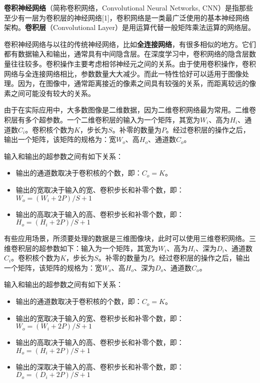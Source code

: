 

\textbf{卷积神经网络}（简称卷积网络，Convolutional Neural Networks, CNN）是指那些至少有一层为卷积层的神经网络[1]，卷积网络是一类最广泛使用的基本神经网络架构。\textbf{卷积层}（Convolutional Layer）是用运算代替一般矩阵乘法运算的网络层。

卷积神经网络与以往的传统神经网络，比如\textbf{全连接网络}，有很多相似的地方。它们都有数据输入和输出，通常具有中间隐含层。在深度学习中，卷积网络的隐含层数量往往较多。卷积操作主要考虑相邻神经元之间的关系。由于使用卷积操作，卷积网络与全连接网络相比，参数数量大大减少。而此一特性恰好可以适用于图像处理。因为，在图像中，通常距离接近的像素之间具有较强的关系，而距离较远的像素之间可能没有较大的关系。

由于在实际应用中，大多数图像是二维数据，因为二维卷积网络最为常用。二维卷积层有多个超参数。一个二维卷积层的输入为一个矩阵，其宽为$W_i$、高为$H_i$、通道数$C_i$。卷积核个数为$K$，步长为$S$。补零的数量为$P$。经过卷积层的操作之后，输出一个矩阵，该矩阵的规格为：宽$W_o$、高$H_o$、通道数$C_o$。

输入和输出的超参数之间有如下关系： \\
\begin{itemize}
\item 输出的通道数取决于卷积核的个数，即：$C_o=K$。
\item 输出的宽取决于输入的宽、卷积步长和补零个数，即：$W_o=(W_i+2P)/S+1$
\item 输出的高取决于输入的高、卷积步长和补零个数，即：$H_o=(H_i+2P)/S+1$
\end{itemize}

有些应用场景，所须要处理的数据是三维图像块，此时可以使用三维卷积网络。三维卷积层的超参数如下：输入为一个矩阵，其宽为$W_i$、高为$H_i$、深为$D_i$、通道数$C_i$。卷积核个数为$K$，步长为$S$。补零的数量为$P$。经过卷积层的操作之后，输出一个矩阵，该矩阵的规格为：宽$W_o$、高$H_o$、深为$D_o$、通道数$C_o$。

输入和输出的超参数之间有如下关系： \\
\begin{itemize}
\item 输出的通道数取决于卷积核的个数，即：$C_o=K$。
\item 输出的宽取决于输入的宽、卷积步长和补零个数，即：$W_o=(W_i+2P)/S+1$
\item 输出的高取决于输入的高、卷积步长和补零个数，即：$H_o=(H_i+2P)/S+1$
\item 输出的深取决于输入的高、卷积步长和补零个数，即：$D_o=(D_i+2P)/S+1$
\end{itemize}

